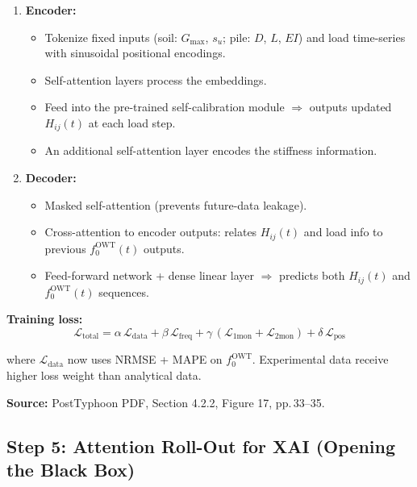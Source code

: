 \documentclass[11pt,a4paper]{article}
\begin{document}
\begin{enumerate}[noitemsep]
  \item \textbf{Encoder:}
    \begin{itemize}[noitemsep]
      \item Tokenize fixed inputs (soil: $G_{\max}$, $s_u$; pile: $D$, $L$, $EI$)
            and load time-series with sinusoidal positional encodings.
      \item Self-attention layers process the embeddings.
      \item Feed into the pre-trained self-calibration module $\Rightarrow$ outputs
            updated $H_{ij}(t)$ at each load step.
      \item An additional self-attention layer encodes the stiffness information.
    \end{itemize}

  \item \textbf{Decoder:}
    \begin{itemize}[noitemsep]
      \item Masked self-attention (prevents future-data leakage).
      \item Cross-attention to encoder outputs: relates $H_{ij}(t)$ and load info
            to previous $f_0^{\text{OWT}}(t)$ outputs.
      \item Feed-forward network + dense linear layer $\Rightarrow$ predicts both
            $H_{ij}(t)$ and $f_0^{\text{OWT}}(t)$ sequences.
    \end{itemize}
\end{enumerate}

\textbf{Training loss:}
\begin{equation}
  \mathcal{L}_{\text{total}} = \alpha\,\mathcal{L}_{\text{data}}
  + \beta\,\mathcal{L}_{\text{freq}}
  + \gamma\,(\mathcal{L}_{\text{1mon}} + \mathcal{L}_{\text{2mon}})
  + \delta\,\mathcal{L}_{\text{pos}}
\end{equation}

where $\mathcal{L}_{\text{data}}$ now uses NRMSE + MAPE on $f_0^{\text{OWT}}$.
Experimental data receive higher loss weight than analytical data.

\textbf{Source:} PostTyphoon PDF, Section 4.2.2, Figure 17, pp.\,33--35.

\subsection{Step 5: Attention Roll-Out for XAI (Opening the Black Box)}
\end{document}
